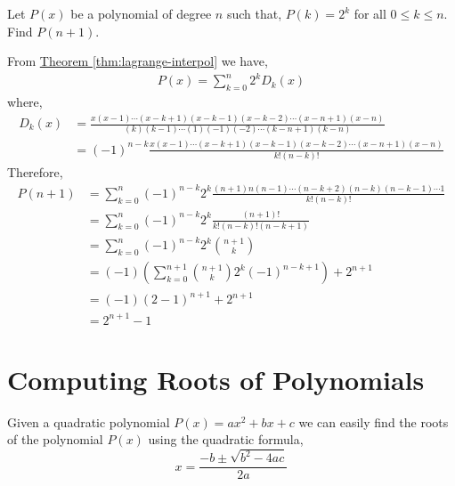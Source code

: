 \documentclass[11pt,numbers=noenddot,svgnames]{scrbook}
\begin{document}
\begin{problem}
    Let $P(x)$ be a polynomial of degree $n$ such that, $P(k)=2^{k}$ for all $0\leq k \leq n$. Find $P(n+1)$.
\end{problem}
\begin{sol}
    From \hyperref[thm:lagrange-interpol]{Theorem \ref{thm:lagrange-interpol}} we have,
    \begin{align*}
        P(x) = \sum_{k=0}^{n} 2^{k}D_{k}(x)
    \end{align*}
    where,
    \begin{align*}
        D_{k}(x) &= \frac{x(x-1)\cdots (x-k+1)(x-k-1)(x-k-2)\cdots (x-n+1)(x-n)}{(k)(k-1)\cdots (1)(-1)(-2) \cdots (k-n+1)(k-n)} \\
        &= (-1)^{n-k} \frac{x(x-1)\cdots (x-k+1)(x-k-1)(x-k-2)\cdots (x-n+1)(x-n)}{k!(n-k)!}
    \end{align*}
    Therefore,
    \begin{align*}
        P(n+1) &= \sum_{k=0}^{n} (-1)^{n-k} 2^{k} \frac{(n+1)n(n-1)\cdots (n-k+2)(n-k)(n-k-1)\cdots 1}{k!(n-k)!} \\
               &= \sum_{k=0}^{n} (-1)^{n-k} 2^{k} \frac{(n+1)!}{k!(n-k)!(n-k+1)} \\
               &= \sum_{k=0}^{n} (-1)^{n-k} 2^{k} {n+1 \choose k} \\
               &= (-1) \left( \sum_{k=0}^{n+1} {n+1 \choose k} 2^{k} (-1)^{n-k+1} \right) + 2^{n+1} \\
               &= (-1)\left( 2 - 1 \right)^{n+1} + 2^{n+1} \\
               &= 2^{n+1} - 1
    \end{align*}    
\end{sol}

\section{Computing Roots of Polynomials}

Given a quadratic polynomial $P(x) = ax^{2} + bx + c$ we can easily find the roots of the polynomial $P(x)$ using 
the quadratic formula,
\[
    x = \frac{-b \pm \sqrt{b^{2} - 4ac}}{2a}
\]
\end{document}
